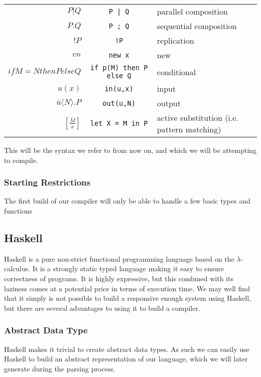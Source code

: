 \begin{table}[hc!]
    \begin{tabular}{r c l}
        $P|Q$& \verb!P | Q!& parallel composition\\
        $P.Q$& \verb!P ; Q!& sequential composition\\
        $!P$ & \verb?!P?& replication \\
        $vn$& \verb!new x!& new \\
        $if M=N then P else Q $&\verb!if p(M) then P else Q!& conditional \\
        $u(x)$&\verb!in(u,x)!& input \\
        $\bar{u}\langle N \rangle .P$&\verb!out(u,N)!& output \\
        $\left[ \frac{M}{x} \right]$&\verb!let X = M in P!&  active substitution (i.e. pattern matching) \\
    \end{tabular}
\end{table} 

This will be the syntax we refer to from now on, and which we will be attempting to compile.

\subsubsection{Starting Restrictions}

The first build of our compiler will only be able to handle a few basic types and functions

\subsection{Haskell}

Haskell is a pure non-strict functional programming language based on the $\lambda$-calculus. It is a strongly static typed language making it easy to ensure correctness of programs. It is highly expressive, but this combined with its laziness comes at a potential price in terms of execution time. We may well find that it simply is not possible to build a responsive enough system using Haskell, but there are several advantages to using it to build a compiler.

\subsubsection{Abstract Data Type}
Haskell makes it trivial to create abstract data types. As such we can easily use Haskell to build an abstract representation of our language, which we will later generate during the parsing process.
    

